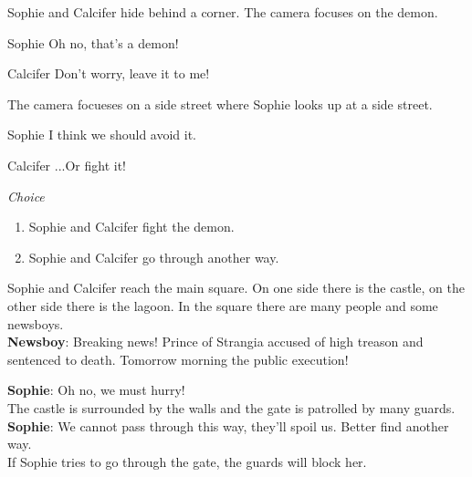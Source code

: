 \begin{screenplay}

Sophie and Calcifer hide behind a corner. The camera focuses on the demon.

\begin{dialogue}[worried]{Sophie}
Oh no, that’s a demon!
\end{dialogue}
\begin{dialogue}[feisty]{Calcifer}
Don’t worry, leave it to me!
\end{dialogue}

The camera focueses on a side street where Sophie looks up at a side street.

\begin{dialogue}{Sophie}
I think we should avoid it.
\end{dialogue}

\begin{dialogue}{Calcifer}
...Or fight it!
\end{dialogue}
\end{screenplay}

\textit{Choice}
\begin{enumerate}
  \item Sophie and Calcifer fight the demon.
  \item Sophie and Calcifer go through another way.
\end{enumerate}
  
\noindent Sophie and Calcifer reach the main square. On one side there is the castle, on the other side there is the lagoon.
In the square there are many people and some newsboys.\\

\textbf{Newsboy}: Breaking news! Prince of Strangia accused of high treason and sentenced to death. Tomorrow morning the public execution!

\textbf{Sophie}: Oh no, we must hurry!\\

The castle is surrounded by the walls and the gate is patrolled by many guards.\\

\textbf{Sophie}: We cannot pass through this way, they’ll spoil us. Better find another way.\\

\noindent If Sophie tries to go through the gate, the guards will block her.\\

